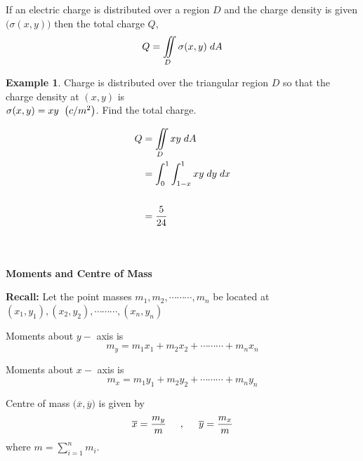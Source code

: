 \documentclass[11pt,a4paper]{article}
\theoremstyle{definition}
\newtheorem{exa}[thm]{Example}
\newcommand{\subhead}[1]{%
  \par\medskip\noindent\textbf{#1}\par\nobreak\smallskip}
\begin{document}
If an electric charge is distributed over a region $D$ and the charge density is given $\big(\sigma (x,y))$ then the total charge $Q$, $$Q = \iint\limits_D \sigma (x,y)\hspace{0.1cm}dA$$


\begin{exa}


Charge is distributed over the triangular region $D$ so that the charge density at $(x,y)$ is \\$\sigma(x,y) = xy\hspace{0.2cm} \big(c/m^2\big)$. Find the total charge.


\begin{figure}[H]
\centering
{}
\end{figure}

\begin{align*}
Q & = \iint\limits_D xy\hspace{0.1cm}dA\\
& = \int^1_0\int^1_{1-x} xy\hspace{0.1cm}dy\hspace{0.1cm}dx\\\\
& = \frac{5}{24}\\\\\\
\end{align*}
\end{exa}

\subhead{Moments and Centre of Mass}


\textbf{Recall:} Let the point masses $m_1,m_2,\cdots\cdots\cdots, m_n$ be located at $(x_1,y_1), (x_2,y_2),\cdots\cdots\cdots, (x_n,y_n)$


Moments about $y-$ axis is 
$$m_y = m_1x_1 + m_2x_2 + \cdots\cdots\cdots + m_nx_n$$ 

Moments about $x-$ axis is 
$$m_x = m_1y_1 + m_2y_2 + \cdots\cdots\cdots + m_ny_n$$

Centre of mass $\big(\overline{x},\overline{y}\big)$ is given by $$\overline{x} = \frac{m_y}{m}\hspace{0.5cm} , \hspace{0.5cm} \overline{y} = \frac{m_x}{m}$$ where $m = \displaystyle{\sum^n_{i=1} m_i}.$
\end{document}
